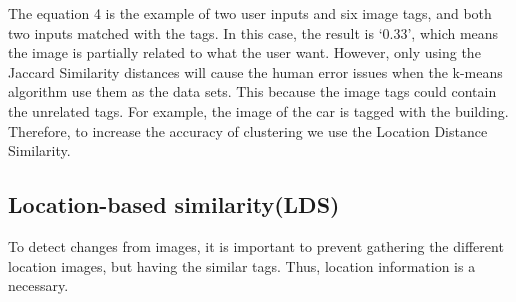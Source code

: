 \documentclass[runningheads,a4paper]{llncs}
\begin{document}
The equation 4 is the example of two user inputs and six image tags, and both two inputs matched with the tags. In this case, the result is `0.33', which means the image is partially related to what the user want. 
However, only using the Jaccard Similarity distances will cause the human error issues when the k-means algorithm use them as the data sets. This because the image tags could contain the unrelated tags. For example, the image of the car is tagged with the building. Therefore, to increase the accuracy of clustering we use the Location Distance Similarity.

\subsection{Location-based similarity(LDS)} 

To detect changes from images, it is important to prevent gathering the different location images, but having the similar tags.
Thus, location information is a necessary. 

%
%
\end{document}
